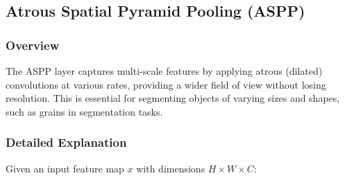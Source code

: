 \documentclass[conference]{IEEEtran}
\begin{document}
\subsection{Atrous Spatial Pyramid Pooling (ASPP)}

\subsubsection{Overview}
The ASPP layer captures multi-scale features by applying atrous (dilated) convolutions at various rates, providing a wider field of view without losing resolution. This is essential for segmenting objects of varying sizes and shapes, such as grains in segmentation tasks.

\subsubsection{Detailed Explanation}
Given an input feature map $ x $ with dimensions $ H \times W \times C $:
\end{document}
